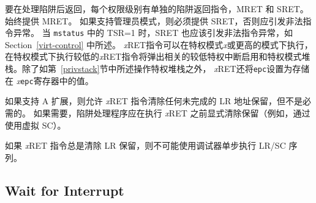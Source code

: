 {\iffalse
To return after handling a trap, there are separate trap return
instructions per privilege level, MRET and SRET.  MRET is
always provided. SRET must be provided if supervisor mode is
supported, and should raise an illegal instruction exception otherwise. SRET
should also raise an illegal instruction exception when TSR=1 in {\tt mstatus},
as described in Section~\ref{virt-control}.
An {\em x}\/RET instruction can be executed in privilege mode {\em x}
or higher, where executing a lower-privilege {\em x}\/RET instruction
will pop the relevant lower-privilege interrupt enable and privilege
mode stack.  In addition to manipulating the privilege stack as
described in Section~\ref{privstack}, {\em x}\/RET sets the {\tt pc}
to the value stored in the {\em x}\/{\tt epc} register.

If the A extension is supported, the {\em x}\/RET instruction is
allowed to clear any outstanding LR address reservation but is not
required to.  Trap handlers should explicitly clear the reservation if
required (e.g., by using a dummy SC) before executing the {\em x}\/RET.
\fi
要在处理陷阱后返回，每个权限级别有单独的陷阱返回指令，MRET 和 SRET。 始终提供 MRET。 如果支持管理员模式，则必须提供 SRET，否则应引发非法指令异常。 当 {\tt mstatus} 中的 TSR=1 时，SRET 也应该引发非法指令异常，如 Section~\ref{virt-control} 中所述。
{\em x}\/RET指令可以在特权模式{\em x}或更高的模式下执行，在特权模式下执行较低的{\em x}\/RET指令将弹出相关的较低特权中断启用和特权模式堆栈。除了如第~\ref{privstack}节中所述操作特权堆栈之外， {\em x}\/RET还将{\tt epc}设置为存储在 {\em x}\/{\tt epc}寄存器中的值。

如果支持 A 扩展，则允许 {\em x}\/RET 指令清除任何未完成的 LR 地址保留，但不是必需的。 如果需要，陷阱处理程序应在执行 {\em x}\/RET 之前显式清除保留（例如，通过使用虚拟 SC）。

\iffalse
\begin{commentary}
  If {\em x}\/RET instructions always cleared LR reservations, it would
  be impossible to single-step through LR/SC sequences using a
  debugger.
\end{commentary}
\fi
\begin{commentary}
 如果 {\em x}\/RET 指令总是清除 LR 保留，则不可能使用调试器单步执行 LR/SC 序列。
\end{commentary}

\subsection{Wait for Interrupt}
\label{wfi}

}
